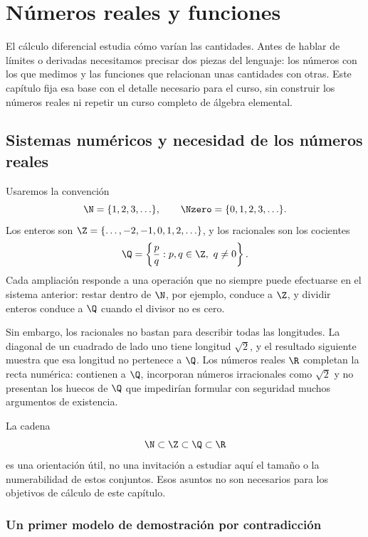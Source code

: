 \chapter{Números reales y funciones}
\label{chap:numeros-reales-funciones}

El cálculo diferencial estudia cómo varían las cantidades. Antes de hablar de
límites o derivadas necesitamos precisar dos piezas del lenguaje: los números
con los que medimos y las funciones que relacionan unas cantidades con otras.
Este capítulo fija esa base con el detalle necesario para el curso, sin
construir los números reales ni repetir un curso completo de álgebra elemental.

\section{Sistemas numéricos y necesidad de los números reales}
\label{sec:sistemas-numericos}

Usaremos la convención
\[
  \N=\{1,2,3,\ldots\}, \qquad
  \Nzero=\{0,1,2,3,\ldots\}.
\]
Los enteros son
\(\Z=\{\ldots,-2,-1,0,1,2,\ldots\}\), y los racionales son los cocientes
\[
  \Q=\left\{\frac{p}{q}:p,q\in\Z,\ q\ne0\right\}.
\]
Cada ampliación responde a una operación que no siempre puede efectuarse en el
sistema anterior: restar dentro de \(\N\), por ejemplo, conduce a \(\Z\), y
dividir enteros conduce a \(\Q\) cuando el divisor no es cero.

Sin embargo, los racionales no bastan para describir todas las longitudes. La
diagonal de un cuadrado de lado uno tiene longitud \(\sqrt2\), y el resultado
siguiente muestra que esa longitud no pertenece a \(\Q\). Los números reales
\(\R\) completan la recta numérica: contienen a \(\Q\), incorporan números
irracionales como \(\sqrt2\) y no presentan los huecos de \(\Q\) que impedirían
formular con seguridad muchos argumentos de existencia.

La cadena
\[
  \N\subset\Z\subset\Q\subset\R
\]
es una orientación útil, no una invitación a estudiar aquí el tamaño o la
numerabilidad de estos conjuntos. Esos asuntos no son necesarios para los
objetivos de cálculo de este capítulo.

\subsection{Un primer modelo de demostración por contradicción}

